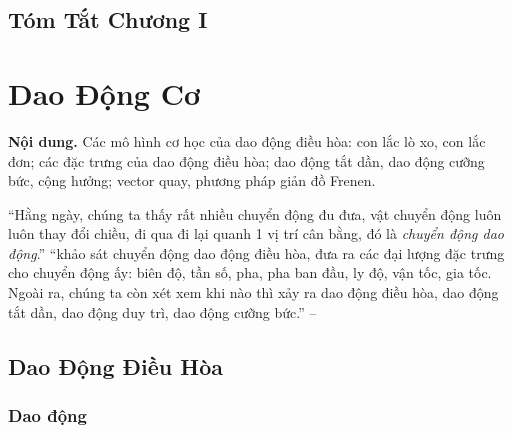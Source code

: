 \documentclass{article}
\numberwithin{equation}{section}
\begin{document}

\subsection{Tóm Tắt Chương I}


\section{Dao Động Cơ}
\textsf{\textbf{Nội dung.} Các mô hình cơ học của dao động điều hòa: con lắc lò xo, con lắc đơn; các đặc trưng của dao động điều hòa; dao động tắt dần, dao động cưỡng bức, cộng hưởng; vector quay, phương pháp giản đồ Frenen.}

``Hằng ngày, chúng ta thấy rất nhiều chuyển động đu đưa, vật chuyển động luôn luôn thay đổi chiều, đi qua đi lại quanh 1 vị trí cân bằng, đó là \textit{chuyển động dao động}.'' ``khảo sát chuyển động dao động điều hòa, đưa ra các đại lượng đặc trưng cho chuyển động ấy: biên độ, tần số, pha, pha ban đầu, ly độ, vận tốc, gia tốc. Ngoài ra, chúng ta còn xét xem khi nào thì xảy ra dao động điều hòa, dao động tắt dần, dao động duy trì, dao động cưỡng bức.'' -- \cite[p. 28]{SGK_Vat_Ly_12_nang_cao}

\subsection{Dao Động Điều Hòa}

\subsubsection{Dao động}
\end{document}

